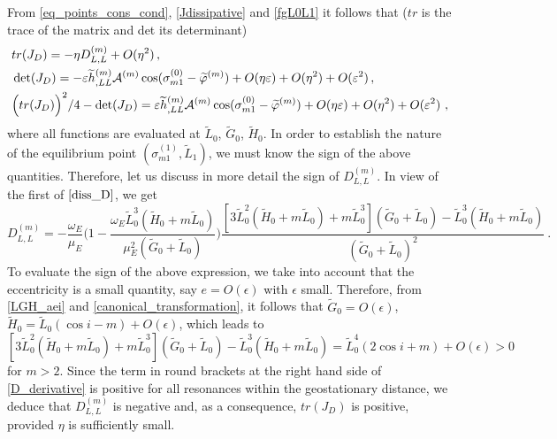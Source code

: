 \documentclass[12pt,reqno]{amsart}
\numberwithin{equation}{section}
\begin{document}
From \eqref{eq_points_cons_cond}, \eqref{Jdissipative} and  \eqref{fgL0L1} it follows that
($tr$ is the trace of the matrix and det its determinant)
\begin{equation}\label{JDtrace}
\begin{split}
&tr (J_D)=  -\eta D_{L,L}^{(m)}+ O (\eta^2)\,,\nonumber\\
&\det(J_D)= -\varepsilon \widetilde{h}^{(m)}_{,LL}  \mathcal{A}^{(m)} \cos(\sigma_{m1}^{(0)}-
\widetilde{\varphi}^{(m)})+ O (\eta \varepsilon)+ O (\eta^2)+ O(\varepsilon^2)\,,\nonumber\\
& \Bigl(tr (J_D)\Bigr)^2/4-\det(J_D)=\varepsilon \widetilde{h}^{(m)}_{,LL} \mathcal{A}^{(m)}
\cos(\sigma_{m1}^{(0)}- \widetilde{\varphi}^{(m)})+ O (\eta \varepsilon)+ O (\eta^2)+ O(\varepsilon^2)\ ,\nonumber
\end{split}
\end{equation}
where all functions are evaluated at $\widetilde{L}_0$, $\widetilde{G}_0$, $\widetilde{H}_0$.
In order to establish the nature of the equilibrium point $(\sigma_{m1}^{(1)}, \widetilde{L}_1)$,
we must know the sign of the above quantities. Therefore, let us discuss in more detail the sign of $D_{L,L}^{(m)}$.
In view of the first of $\eqref{diss_D}$, we get
\begin{equation}\label{D_derivative}
D_{L,L}^{(m)}=-\frac{\omega_E}{\mu_E} \biggl(1-\frac{\omega_E \widetilde{L}^3_0 (\widetilde{H}_0+m \widetilde{L}_0)}
{\mu_E^2 (\widetilde{G}_0+\widetilde{L}_0)} \biggr) \frac{[3 \widetilde{L}^2_0
(\widetilde{H}_0+m \widetilde{L}_0)+m \widetilde{L}_0^3](\widetilde{G}_0+\widetilde{L}_0)-
\widetilde{L}_0^3 (\widetilde{H}_0+m \widetilde{L}_0)}{(\widetilde{G}_0+\widetilde{L}_0)^2}\ .
\end{equation}
To evaluate the sign of the above expression, we take into account that the
eccentricity is a small quantity, say $e=O(\epsilon)$ with $\epsilon$ small. Therefore,
from \eqref{LGH_aei} and \eqref{canonical_transformation},
it follows that $\widetilde{G}_0=O(\epsilon)$, $\widetilde{H}_0=\widetilde{L}_0(\cos i -m)+O(\epsilon)$,
which leads to
$$
[3 \widetilde{L}^2_0 (\widetilde{H}_0+m \widetilde{L}_0)+m \widetilde{L}_0^3](\widetilde{G}_0+\widetilde{L}_0)
-\widetilde{L}_0^3 (\widetilde{H}_0+m \widetilde{L}_0) = \widetilde{L}_0^4 (2\cos i +m)+O(\epsilon) >0
$$
for $m>2$.
Since the term in round brackets at the right hand side of \eqref{D_derivative} is positive for all resonances
within the geostationary distance,
we deduce that $D_{L,L}^{(m)}$ is negative and, as a consequence, $tr (J_D)$ is positive, provided
$\eta$ is sufficiently small.
\end{document}
